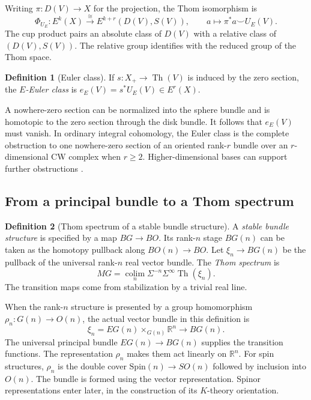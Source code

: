 \documentclass[11pt]{article}
\theoremstyle{definition}
\newtheorem{defn}{Definition}[section]
\newcommand{\Th}{\operatorname{Th}}
\newcommand{\Spin}{\mathrm{Spin}}
\begin{document}
Writing \(\pi:D(V)\to X\) for the projection, the Thom isomorphism is
\begin{equation}\label{thom}
 \Phi_{U_E}:E^k(X)\xrightarrow{\cong} E^{k+r}(D(V),S(V)),
 \qquad a\longmapsto\pi^*a\smile U_E(V).
\end{equation}
The cup product pairs an absolute class of \(D(V)\) with a relative class of \((D(V),S(V))\). The relative group identifies with the reduced group of the Thom space.

\begin{defn}[Euler class]
If \(s:X_+\to\Th(V)\) is induced by the zero section, the \emph{\(E\)-Euler class} is \(e_E(V)=s^*U_E(V)\in E^r(X)\).
\end{defn}
A nowhere-zero section can be normalized into the sphere bundle and is homotopic to the zero section through the disk bundle. It follows that \(e_E(V)\) must vanish. In ordinary integral cohomology, the Euler class is the complete obstruction to one nowhere-zero section of an oriented rank-\(r\) bundle over an \(r\)-dimensional CW complex when \(r\geq 2\). Higher-dimensional bases can support further obstructions \cite{MS}.

\subsection{From a principal bundle to a Thom spectrum}
\begin{defn}[Thom spectrum of a stable bundle structure]
A \emph{stable bundle structure} is specified by a map \(BG\to BO\). Its rank-\(n\) stage \(BG(n)\) can be taken as the homotopy pullback along \(BO(n)\to BO\). Let \(\xi_n\to BG(n)\) be the pullback of the universal rank-\(n\) real vector bundle. The \emph{Thom spectrum} is
\[
 MG=\operatorname*{colim}_n\Sigma^{-n}\Sigma^\infty\Th(\xi_n).
\]
The transition maps come from stabilization by a trivial real line.
\end{defn}

When the rank-\(n\) structure is presented by a group homomorphism \(\rho_n:G(n)\to O(n)\), the actual vector bundle in this definition is
\[
 \xi_n=EG(n)\times_{G(n)}\mathbb R^n\longrightarrow BG(n).
\]
The universal principal bundle \(EG(n)\to BG(n)\) supplies the transition functions. The representation \(\rho_n\) makes them act linearly on \(\mathbb R^n\). For spin structures, \(\rho_n\) is the double cover \(\Spin(n)\to SO(n)\) followed by inclusion into \(O(n)\). The bundle is formed using the vector representation. Spinor representations enter later, in the construction of its \(K\)-theory orientation.
\end{document}
